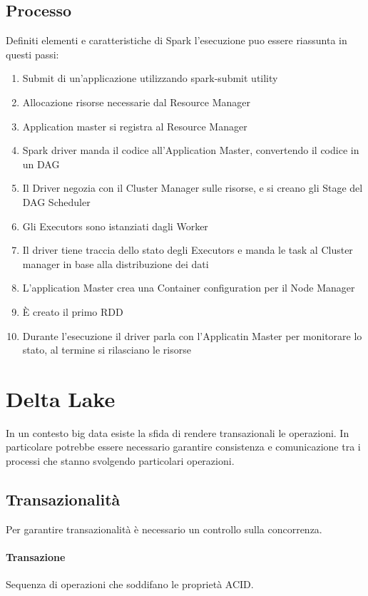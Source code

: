 \documentclass[a4paper]{article}
\begin{document}
\subsection{Processo}
Definiti elementi e caratteristiche di Spark l'esecuzione puo essere riassunta 
in questi passi:
\begin{enumerate}
    \item Submit di un'applicazione utilizzando spark-submit utility
    \item Allocazione risorse necessarie dal Resource Manager
    \item Application master si registra al Resource Manager
    \item Spark driver manda il codice all'Application Master, convertendo il codice
    in un DAG
    \item Il Driver negozia con il Cluster Manager sulle risorse, e si creano gli Stage del 
    DAG Scheduler
    \item Gli Executors sono istanziati dagli Worker
    \item Il driver tiene traccia dello stato degli Executors e manda le task al 
    Cluster manager in base alla distribuzione dei dati
    \item L'application Master crea una Container configuration per il Node Manager
    \item È creato il primo RDD
    \item Durante l'esecuzione il driver parla con l'Applicatin Master per monitorare
    lo stato, al termine si rilasciano le risorse
\end{enumerate}

\section{Delta Lake}
In un contesto big data esiste la sfida di rendere transazionali le operazioni.
In particolare potrebbe essere necessario garantire consistenza e comunicazione tra
i processi che stanno svolgendo particolari operazioni.

\subsection{Transazionalità}
Per garantire transazionalità è necessario un controllo sulla concorrenza.

\paragraph{Transazione}
Sequenza di operazioni che soddifano le proprietà ACID.
\end{document}
